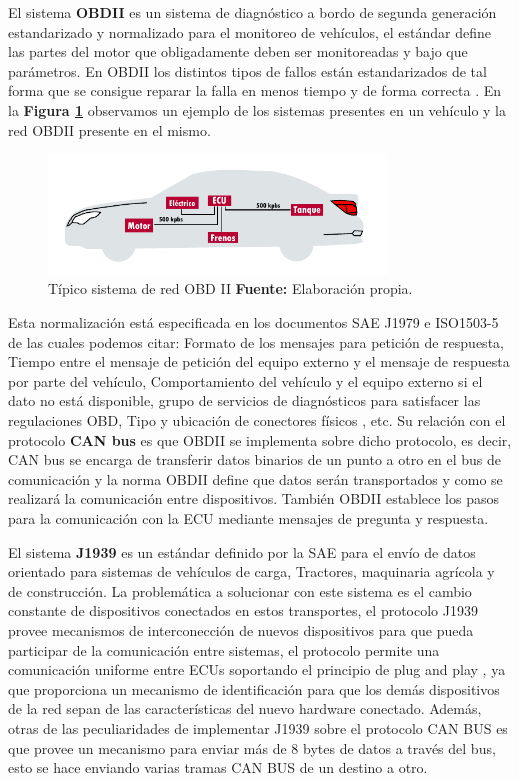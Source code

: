 El sistema {\bfseries OBDII} es un sistema de diagnóstico a bordo de segunda generación estandarizado y normalizado para el monitoreo de vehículos, el estándar define las partes del motor que obligadamente deben ser monitoreadas  y bajo que parámetros. En OBDII los distintos tipos de fallos están estandarizados de tal forma que se consigue reparar la falla en menos tiempo y de forma correcta \cite{obd_c3}. En la \textbf{Figura \ref{fig_obd_c3}} observamos un ejemplo de los sistemas presentes en un vehículo y la red OBDII presente en el mismo. 

\begin{figure}[H]
	\centering
	\includegraphics[width=0.8\textwidth]{./Cap3imagen/obd.pdf}
	\caption [Típico sistema de red CAN.]{Típico sistema de red OBD II\textbf{ Fuente:} %
		Elaboración propia.}
	\label{fig_obd_c3} %
\end{figure}

Esta normalización está especificada en los documentos SAE J1979 e ISO1503-5 de las cuales podemos citar: Formato de los mensajes para petición de respuesta, Tiempo entre el mensaje de petición del equipo externo y el mensaje de respuesta por parte del vehículo, Comportamiento del vehículo y el equipo externo si el dato no está disponible, grupo de servicios de diagnósticos para satisfacer las regulaciones OBD, Tipo y ubicación de conectores físicos \cite{list_c3}, etc. Su relación con el protocolo {\bfseries CAN bus} es que OBDII se implementa sobre dicho protocolo, es decir, CAN bus se encarga de transferir datos binarios de un punto a otro en el bus de comunicación y  la norma OBDII define que datos serán transportados y como se realizará la comunicación entre dispositivos. También OBDII establece los pasos para la comunicación con la ECU mediante mensajes de pregunta y respuesta. 

El sistema {\bfseries J1939} es un estándar definido por la SAE para el envío de datos orientado para sistemas de vehículos de carga, Tractores,  maquinaria agrícola y de construcción.  La problemática a solucionar con este sistema es el cambio constante de dispositivos conectados en estos transportes, el protocolo J1939 provee mecanismos de interconección de nuevos dispositivos para que pueda participar de la comunicación entre sistemas, el protocolo permite una comunicación uniforme entre ECUs soportando el principio de plug and play \cite{j19_c3}, ya que proporciona un mecanismo de identificación para que los demás dispositivos de la red sepan de las características del nuevo hardware conectado. Además, otras de las peculiaridades de implementar J1939 sobre el protocolo CAN BUS es que provee un mecanismo para enviar más de 8 bytes de datos a través del bus, esto se hace enviando varias tramas CAN BUS de un destino a otro. 


